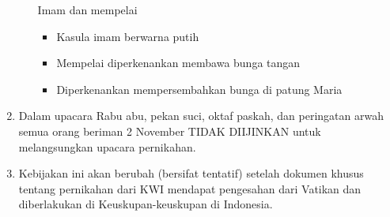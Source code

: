 \begin{enumerate}
\begin{enumerate}
    Imam dan mempelai
\begin{itemize}
\item        Kasula imam berwarna putih
\item        Mempelai diperkenankan membawa bunga tangan
\item        Diperkenankan mempersembahkan bunga di patung Maria
\end{itemize}
\end{enumerate}

\item Dalam upacara Rabu abu, pekan suci, oktaf paskah, dan peringatan arwah semua orang beriman 2 November TIDAK DIIJINKAN untuk melangsungkan upacara pernikahan.

\item Kebijakan ini akan berubah (bersifat tentatif) setelah dokumen khusus tentang pernikahan dari KWI mendapat pengesahan dari Vatikan dan diberlakukan di Keuskupan-keuskupan di Indonesia.
\end{enumerate}